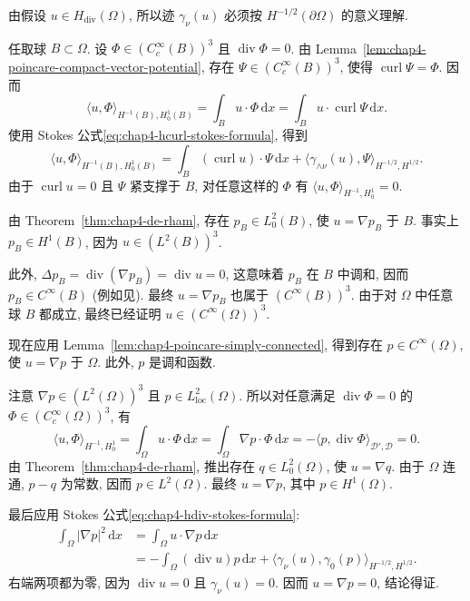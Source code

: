\begin{Proof}
由假设 $u\in H_{\operatorname{div}}(\Omega)$, 所以迹 $\gamma_\nu(u)$ 必须按 $H^{-1/2}(\partial\Omega)$ 的意义理解.

任取球 $B\subset\Omega$. 设 $\Phi\in(C_c^\infty(B))^3$ 且 $\operatorname{div}\Phi=0$. 由 Lemma~\ref{lem:chap4-poincare-compact-vector-potential}, 存在 $\Psi\in(C_c^\infty(B))^3$, 使得 $\operatorname{curl}\Psi=\Phi$. 因而
\[
 \langle u,\Phi\rangle_{H^{-1}(B),H_0^1(B)}
 =\int_Bu\cdot\Phi\,\mathrm dx
 =\int_Bu\cdot\operatorname{curl}\Psi\,\mathrm dx.
\]
使用 Stokes 公式\eqref{eq:chap4-hcurl-stokes-formula}, 得到
\[
 \langle u,\Phi\rangle_{H^{-1}(B),H_0^1(B)}
 =\int_B(\operatorname{curl}u)\cdot\Psi\,\mathrm dx
 +\langle\gamma_{\wedge\nu}(u),\Psi\rangle_{H^{-1/2},H^{1/2}}.
\]
由于 $\operatorname{curl}u=0$ 且 $\Psi$ 紧支撑于 $B$, 对任意这样的 $\Phi$ 有 $\langle u,\Phi\rangle_{H^{-1},H_0^1}=0$.

由 Theorem~\ref{thm:chap4-de-rham}, 存在 $p_B\in L_0^2(B)$, 使 $u=\nabla p_B$ 于 $B$. 事实上 $p_B\in H^1(B)$, 因为 $u\in(L^2(B))^3$.

此外, $\Delta p_B=\operatorname{div}(\nabla p_B)=\operatorname{div}u=0$, 这意味着 $p_B$ 在 $B$ 中调和, 因而 $p_B\in C^\infty(B)$ (例如见). 最终 $u=\nabla p_B$ 也属于 $(C^\infty(B))^3$. 由于对 $\Omega$ 中任意球 $B$ 都成立, 最终已经证明 $u\in(C^\infty(\Omega))^3$.

现在应用 Lemma~\ref{lem:chap4-poincare-simply-connected}, 得到存在 $p\in C^\infty(\Omega)$, 使 $u=\nabla p$ 于 $\Omega$. 此外, $p$ 是调和函数.

注意 $\nabla p\in(L^2(\Omega))^3$ 且 $p\in L_{\mathrm{loc}}^2(\Omega)$. 所以对任意满足 $\operatorname{div}\Phi=0$ 的 $\Phi\in(C_c^\infty(\Omega))^3$, 有
\[
 \langle u,\Phi\rangle_{H^{-1},H_0^1}
 =\int_\Omega u\cdot\Phi\,\mathrm dx
 =\int_\Omega\nabla p\cdot\Phi\,\mathrm dx
 =-\langle p,\operatorname{div}\Phi\rangle_{\mathcal D',\mathcal D}=0.
\]
由 Theorem~\ref{thm:chap4-de-rham}, 推出存在 $q\in L_0^2(\Omega)$, 使 $u=\nabla q$. 由于 $\Omega$ 连通, $p-q$ 为常数, 因而 $p\in L^2(\Omega)$. 最终 $u=\nabla p$, 其中 $p\in H^1(\Omega)$.

最后应用 Stokes 公式\eqref{eq:chap4-hdiv-stokes-formula}:
\[
 \begin{aligned}
 \int_\Omega|\nabla p|^2\,\mathrm dx
 &=\int_\Omega u\cdot\nabla p\,\mathrm dx\\
 &=-\int_\Omega(\operatorname{div}u)p\,\mathrm dx
 +\langle\gamma_\nu(u),\gamma_0(p)\rangle_{H^{-1/2},H^{1/2}}.
 \end{aligned}
\]
右端两项都为零, 因为 $\operatorname{div}u=0$ 且 $\gamma_\nu(u)=0$. 因而 $u=\nabla p=0$, 结论得证.
\end{Proof}
